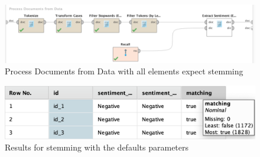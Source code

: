 \documentclass[a4paper]{article}
\begin{document}
\begin{figure}[H]
	\includegraphics[width=\linewidth]{imgs/part_3/3_processing_documents_no_stem}
	\caption{Process Documents from Data with all elements expect stemming}
	\label{fig:3_processing_documents_no_stem}
\end{figure}
\begin{figure}[H]
	\includegraphics[width=\linewidth]{imgs/part_3/3_processing_documents_no_stem_results}
	\caption{Results for stemming with the defaults parameters}
	\label{fig:3_processing_documents_no_stem_results}
\end{figure}
\end{document}
